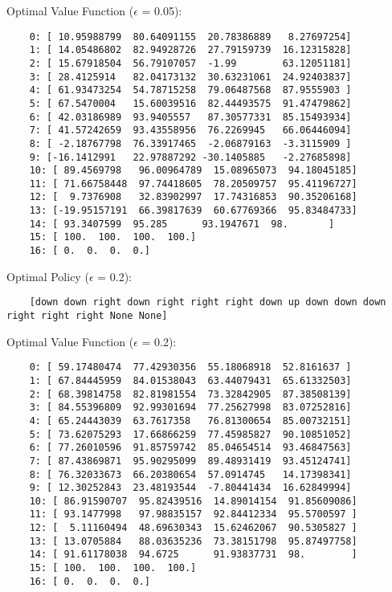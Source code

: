 \documentclass{article}
\begin{document}
  \noindent
  Optimal Value Function ($\epsilon$ = 0.05):
  \begin{verbatim}
    0: [ 10.95988799  80.64091155  20.78386889   8.27697254]
    1: [ 14.05486802  82.94928726  27.79159739  16.12315828]
    2: [ 15.67918504  56.79107057  -1.99        63.12051181]
    3: [ 28.4125914   82.04173132  30.63231061  24.92403837]
    4: [ 61.93473254  54.78715258  79.06487568  87.9555903 ]
    5: [ 67.5470004   15.60039516  82.44493575  91.47479862]
    6: [ 42.03186989  93.9405557   87.30577331  85.15493934]
    7: [ 41.57242659  93.43558956  76.2269945   66.06446094]
    8: [ -2.18767798  76.33917465  -2.06879163  -3.3115909 ]
    9: [-16.1412991   22.97887292 -30.1405885   -2.27685898]
    10: [ 89.4569798   96.00964789  15.08965073  94.18045185]
    11: [ 71.66758448  97.74418605  78.20509757  95.41196727]
    12: [  9.7376908   32.83902997  17.74316853  90.35206168]
    13: [-19.95157191  66.39817639  60.67769366  95.83484733]
    14: [ 93.3407599  95.285      93.1947671  98.       ]
    15: [ 100.  100.  100.  100.]
    16: [ 0.  0.  0.  0.]
  \end{verbatim}

  \noindent
  Optimal Policy ($\epsilon$ = 0.2):
  \begin{verbatim}
    [down down right down right right right down up down down down right right right None None]
  \end{verbatim}

  \noindent
  Optimal Value Function ($\epsilon$ = 0.2):
  \begin{verbatim}
    0: [ 59.17480474  77.42930356  55.18068918  52.8161637 ]
    1: [ 67.84445959  84.01538043  63.44079431  65.61332503]
    2: [ 68.39814758  82.81981554  73.32842905  87.38508139]
    3: [ 84.55396809  92.99301694  77.25627998  83.07252816]
    4: [ 65.24443039  63.7617358   76.81300654  85.00732151]
    5: [ 73.62075293  17.66866259  77.45985827  90.10851052]
    6: [ 77.26010596  91.85759742  85.04654514  93.46847563]
    7: [ 87.43869871  95.90295099  89.48931419  93.45124741]
    8: [ 76.32033673  66.20380654  57.0914745   14.17398341]
    9: [ 12.30252843  23.48193544  -7.80441434  16.62849994]
    10: [ 86.91590707  95.82439516  14.89014154  91.85609086]
    11: [ 93.1477998   97.98835157  92.84412334  95.5700597 ]
    12: [  5.11160494  48.69630343  15.62462067  90.5305827 ]
    13: [ 13.0705884   88.03635236  73.38151798  95.87497758]
    14: [ 91.61178038  94.6725      91.93837731  98.        ]
    15: [ 100.  100.  100.  100.]
    16: [ 0.  0.  0.  0.]
  \end{verbatim}
\end{document}
